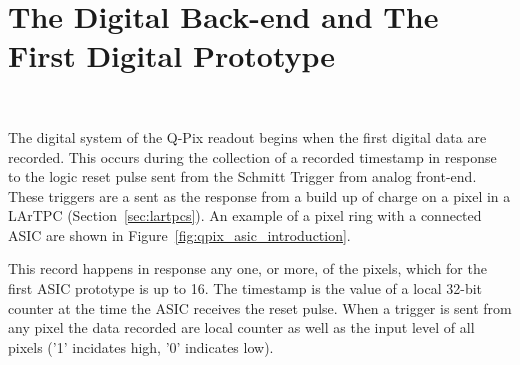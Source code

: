\section{The Digital Back-end and The First Digital Prototype}~\label{sec:digital_prototype}

The digital system of the Q-Pix readout begins when the first digital data are recorded.
This occurs during the collection of a recorded timestamp in response to the logic reset pulse sent from the Schmitt Trigger from analog front-end.
These triggers are a sent as the response from a build up of charge on a pixel in a LArTPC (Section~\ref{sec:lartpcs}).
An example of a pixel ring with a connected ASIC are shown in Figure~\ref{fig:qpix_asic_introduction}.

This record happens in response any one, or more, of the pixels, which for the first ASIC prototype is up to 16.
The timestamp is the value of a local 32-bit counter at the time the ASIC receives the reset pulse.
When a trigger is sent from any pixel the data recorded are local counter as well as the input level of all pixels ('1' incidates high, '0' indicates low).

